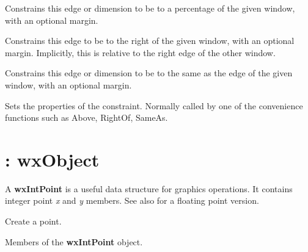 

Constrains this edge or dimension to be to a percentage of the given window, with an
optional margin.



Constrains this edge to be to the right of the given window, with an
optional margin. Implicitly, this is relative to the right edge of the other window.



Constrains this edge or dimension to be to the same as the edge of the given window, with an
optional margin.



Sets the properties of the constraint. Normally called by one of the convenience
functions such as Above, RightOf, SameAs.

\section{: wxObject}\label{wxintpoint}

A {\bf wxIntPoint} is a useful data structure for graphics operations.
It contains integer point {\it x} and {\it y} members.
See also  for a floating point version.




Create a point.



Members of the {\bf wxIntPoint} object.

